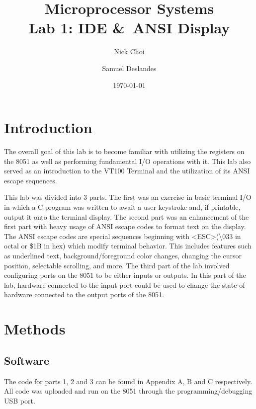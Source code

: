 \documentclass[12pt]{article}
\begin{document}
\title{Microprocessor Systems\\ Lab 1: IDE \&\ ANSI Display}
\author{Nick Choi \and Samuel Deslandes}
\date{\today}
\maketitle
\pagebreak
\section{Introduction}
The overall goal of this lab is to become familiar with utilizing the registers on the 8051 as well as performing fundamental I/O operations with it. This lab also served as an introduction to the VT100 Terminal and the utilization of its ANSI escape sequences.

This lab was divided into 3 parts. The first was an exercise in basic terminal I/O in which a C program was written to await a user keystroke and, if printable, output it onto the terminal display. The second part was an enhancement of the first part with heavy usage of ANSI escape codes to format text on the display. The ANSI escape codes are special sequences beginning with \textless ESC\textgreater (\textbackslash033 in octal or \$1B in hex) which modify terminal behavior. This includes features such as underlined text, background/foreground color changes, changing the cursor position, selectable scrolling, and more. The third part of the lab involved configuring ports on the 8051 to be either inputs or outputs. In this part of the lab, hardware connected to the input port could be used to change the state of hardware connected to the output ports of the 8051. 

\section{Methods}
\subsection{Software}
The code for parts 1, 2 and 3 can be found in Appendix A, B and C respectively. All code was uploaded and run on the 8051 through the programming/debugging USB port. 	
\end{document}
